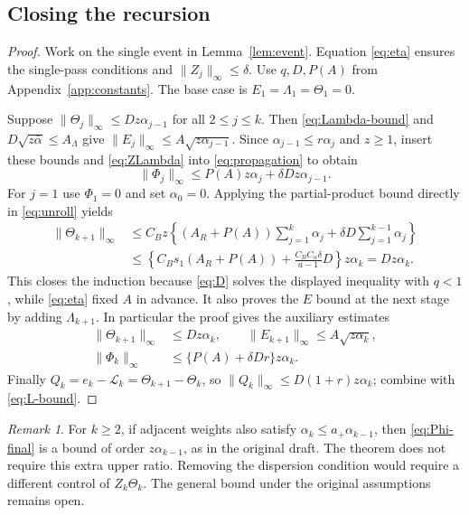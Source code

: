 \documentclass[11pt]{article}
\newcommand{\norm}[1]{\lVert#1\rVert}
\theoremstyle{remark}
\newtheorem*{remark}{Remark}
\begin{document}
\subsection{Closing the recursion}
\begin{proof}
Work on the single event in Lemma~\ref{lem:event}.
Equation \eqref{eq:eta} ensures the single-pass conditions and
\(\norm{Z_j}_\infty\le\delta\).
Use \(q,D,P(A)\) from Appendix~\ref{app:constants}. The base case is \(E_1=\Lambda_1=\Theta_1=0\).

Suppose \(\norm{\Theta_j}_\infty\le Dz\alpha_{j-1}\) for all \(2\le j\le k\).
Then \eqref{eq:Lambda-bound} and \(D\sqrt{z\bar\alpha}\le A_\Lambda\)
give \(\norm{E_j}_\infty\le A\sqrt{z\alpha_{j-1}}\).
Since \(\alpha_{j-1}\le r\alpha_j\) and \(z\ge1\), insert these bounds
and \eqref{eq:ZLambda} into \eqref{eq:propagation} to obtain
\[
 \norm{\Phi_j}_\infty
       \le P(A)z\alpha_j+\delta Dz\alpha_{j-1}.
\]
For \(j=1\) use \(\Phi_1=0\) and set \(\alpha_0=0\).
Applying the partial-product bound directly in \eqref{eq:unroll} yields
\begin{align*}
 \norm{\Theta_{k+1}}_\infty
 &\le C_Bz\left\{(A_R+P(A))\sum_{j=1}^k\alpha_j
                   +\delta D\sum_{j=1}^{k-1}\alpha_j\right\}\\
 &\le\left\{C_Bs_1(A_R+P(A))
              +\frac{C_BC_\alpha\delta}{a-1}D\right\}z\alpha_k
 =Dz\alpha_k .
\end{align*}
This closes the induction because \eqref{eq:D} solves the displayed
inequality with \(q<1\), while \eqref{eq:eta} fixed \(A\) in advance.
It also proves the \(E\) bound at the next stage by adding \(\Lambda_{k+1}\).
In particular the proof gives the auxiliary estimates
\begin{align}
 \norm{\Theta_{k+1}}_\infty&\le Dz\alpha_k,\qquad
 \norm{E_{k+1}}_\infty\le A\sqrt{z\alpha_k},\label{eq:closed}\\
 \norm{\Phi_k}_\infty&\le\{P(A)+\delta Dr\}z\alpha_k.\label{eq:Phi-final}
\end{align}
Finally \(Q_k=e_k-\mathcal L_k=\Theta_{k+1}-\Theta_k\), so
\(\norm{Q_k}_\infty\le D(1+r)z\alpha_k\); combine with
\eqref{eq:L-bound}.
\end{proof}

\begin{remark}
For \(k\ge2\), if adjacent weights also satisfy \(\alpha_k\le a_+\alpha_{k-1}\), then
\eqref{eq:Phi-final} is a bound of order \(z\alpha_{k-1}\), as in the
original draft. The theorem does not require this extra upper ratio.
Removing the dispersion condition would require a different control of
\(Z_k\Theta_k\). The general bound under the original assumptions remains open.
\end{remark}
\end{document}
